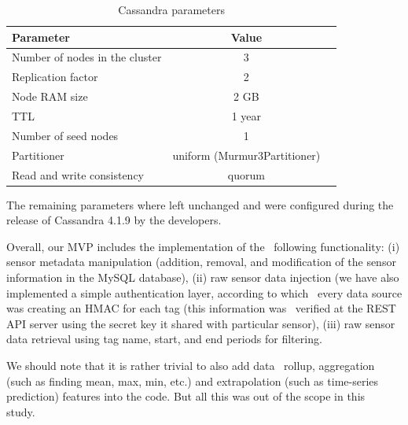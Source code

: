 \begin{table}[htp!]
  \caption{Cassandra parameters}
  \label{tab:params}
  \centering
  \begin{tabular}{lcc}
    \hline
    {\bf Parameter}                                  & {\bf Value } \\
    \hline
    Number of nodes in the cluster                   & 3       \\
    Replication factor                               & 2       \\
    Node RAM size                                    & 2 GB    \\
    TTL                                              & 1 year  \\
    Number of seed nodes                             & 1       \\
    Partitioner                                      & uniform (Murmur3Partitioner) \\
    Read and write consistency                       & quorum  \\
  \end{tabular}
\end{table}

The remaining parameters where left unchanged and were configured
during the release of Cassandra 4.1.9 by the developers.

Overall, our MVP includes the implementation of the 
following functionality: (i) sensor metadata manipulation
(addition, removal, and modification of the sensor information
in the MySQL database), (ii) raw sensor data injection (we
have also implemented a simple authentication layer, according to which 
every data source was creating an HMAC for each tag (this information was 
verified at the REST API server using the secret key it shared
with particular sensor), (iii) raw sensor data
retrieval using tag name, start, and end periods for filtering.

We should note that it is rather trivial to also add data 
rollup, aggregation (such as finding mean, max, min, etc.)
and extrapolation (such as time-series prediction) features
into the code. But all this was out of the scope in this 
study. 

